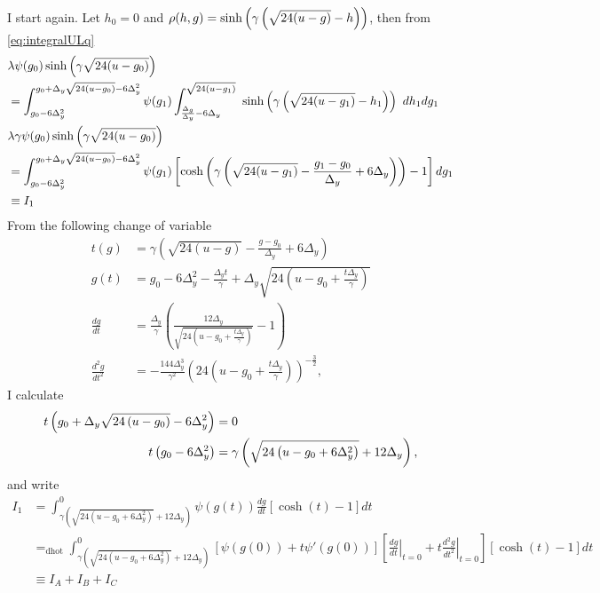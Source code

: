 \documentclass[twocolumn]{article}
\newcommand{\dhot}{=_{\text{dhot}}}
\begin{document}
I start again.  Let $h_0=0$ and $\rho(h,g)=\rhoHG{h}{g}$, then from
\eqref{eq:integralULq}
\renewcommand{\LgQ}{g_0 - 6\Delta_y^2}
\begin{align}
  & \lambda \psi(g_0) \sinh\left(\gamma \sqrt{24(u-g_0)} \right) \nonumber \\
  &= \int_{\LgQ}^{\UgQ} \psi(g_1) \int_{\LhQ}^{\Uh}~ \rhoHG{h_1}{g_1}
  ~dh_1 dg_1 \nonumber \\
  & \lambda \gamma \psi(g_0) \sinh\left(\gamma \sqrt{24(u-g_0)}
  \right) \nonumber \\
  \label{eq:Ione}
  &= \int_{\LgQ}^{\UgQ} \psi(g_1) \left[ \cosh \left(
      \gamma \left( \sqrt{24(u-g_1)} - \frac{g_1 - g_0}{\Delta_y} + 6
        \Delta_y \right) \right) -1 \right] dg_1 \\
  &\equiv I_1 \nonumber
\end{align}
From the following change of variable
\begin{align*}
   t(g) &= \gamma \left( \sqrt{24(u-g)} - \frac{g - g_0}{\Delta_y} +
     6 \Delta_y \right)\\
   g(t) &= g_0 - 6 \Delta_y^2 - \frac{\Delta_y t}{\gamma} +
   \Delta_y \sqrt{24 \left( u-g_0 + \frac{t\Delta_y}{\gamma} \right)} \\
   \frac{d g}{ dt} &= \frac{\Delta_y}{\gamma} \left( \frac{12 \Delta_y} {
       \sqrt{ 24 \left( u - g_0 + \frac{t \Delta_y}{\gamma} \right) }}
     - 1 \right) \\
   \frac{d^2 g}{ dt^2} &= -\frac{144 \Delta_y^3}{\gamma^2}
   \left( 24
     \left( u - g_0 + \frac{t \Delta_y}{\gamma} \right)
   \right)^{-\frac{3}{2}},
\end{align*}
I calculate
\begin{align*}
  t \left( \UgQ \right) &= 0 \\
  t \left( \LgQ \right) &= \gamma \left(
    \sqrt{24\left( u - g_0 + 6 \Delta_y^2 \right) } + 12 \Delta_y \right),
\end{align*}
and write
\newcommand{\LOW}{{\gamma \left( \sqrt{24(u- g_0 + 6\Delta_y^2 )} +
      12\Delta_y \right)}}
\newcommand{\RANGE}{_\LOW ^0}
\newcommand{\INT}{\int\RANGE}
\begin{align*}
  I_1 &= \INT \psi(g(t)) \frac{d g}{d t} [\cosh(t) -1] dt \\
  &\dhot \INT \left[ \psi(g(0)) + t \psi'(g(0)) \right]
  \left[ \left. \frac{d g}{d t} \right|_{t=0}
    + t \left. \frac{d^2g}{d t^2} \right|_{t=0}
  \right]
  [\cosh(t) -1] dt \\
  &\equiv I_{A} +  I_{B} +  I_{C}
\end{align*}
\end{document}
